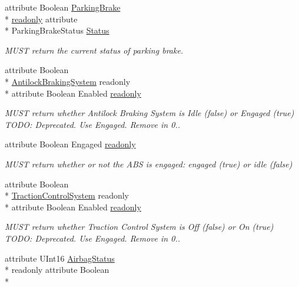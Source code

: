 \begin{DoxyCompactItemize}
\item 
attribute Boolean \hyperlink{interfaceParkingBrake}{Parking\+Brake} \\*
\hyperlink{interfaceVehiclePropertyType_a80c4d8f18eee83fc77fded4ac07c687b}{readonly} attribute \\*
Parking\+Brake\+Status \hyperlink{interfaceVehiclePropertyType_adc169ce047115d43399d1ffa9dd1fb83}{Status}
\begin{DoxyCompactList}\small\item\em M\+U\+S\+T return the current status of parking brake. \end{DoxyCompactList}\item 
attribute Boolean \\*
\hyperlink{interfaceAntilockBrakingSystem}{Antilock\+Braking\+System} readonly \\*
attribute Boolean Enabled \hyperlink{interfaceVehiclePropertyType_a760d70c9172989d6558d4d6a403df792}{readonly}
\begin{DoxyCompactList}\small\item\em M\+U\+S\+T return whether Antilock Braking System is Idle (false) or Engaged (true) T\+O\+D\+O\+: Deprecated. Use Engaged. Remove in 0.. \end{DoxyCompactList}\item 
attribute Boolean Engaged \hyperlink{interfaceVehiclePropertyType_a80c4d8f18eee83fc77fded4ac07c687b}{readonly}
\begin{DoxyCompactList}\small\item\em M\+U\+S\+T return whether or not the A\+B\+S is engaged\+: engaged (true) or idle (false) \end{DoxyCompactList}\item 
attribute Boolean \\*
\hyperlink{interfaceTractionControlSystem}{Traction\+Control\+System} readonly \\*
attribute Boolean Enabled \hyperlink{interfaceVehiclePropertyType_a362c96d9ff226ff1307a26a18e954d48}{readonly}
\begin{DoxyCompactList}\small\item\em M\+U\+S\+T return whether Traction Control System is Off (false) or On (true) T\+O\+D\+O\+: Deprecated. Use Engaged. Remove in 0.. \end{DoxyCompactList}\item 
attribute U\+Int16 \hyperlink{interfaceAirbagStatus}{Airbag\+Status} \\*
readonly attribute Boolean \\*

\end{DoxyCompactItemize}
